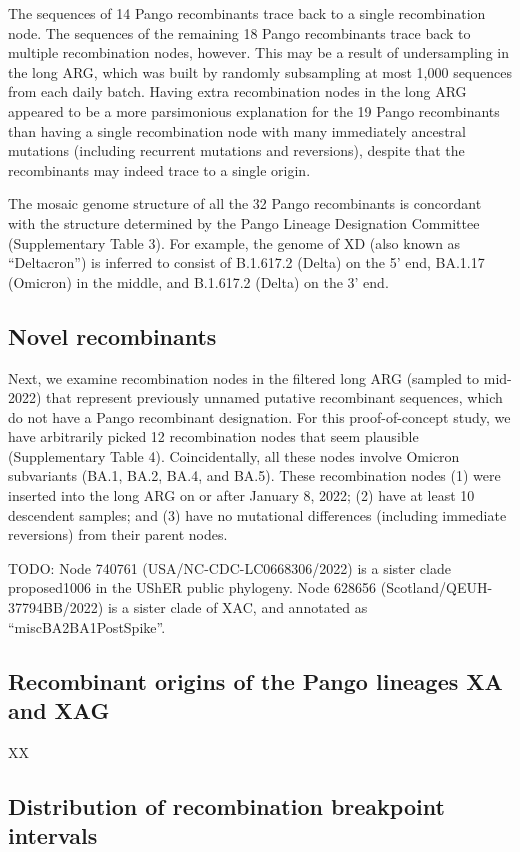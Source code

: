 \documentclass{article}
\begin{document}
The sequences of 14 Pango recombinants trace back to a single recombination
node. The sequences of the remaining 18 Pango recombinants trace back to
multiple recombination nodes, however. This may be a result of undersampling in
the long ARG, which was built by randomly subsampling at most 1,000 sequences
from each daily batch. Having extra recombination nodes in the long ARG
appeared to be a more parsimonious explanation for the 19 Pango recombinants
than having a single recombination node with many immediately ancestral
mutations (including recurrent mutations and reversions), despite that the
recombinants may indeed trace to a single origin.

The mosaic genome structure of all the 32 Pango recombinants is concordant with
the structure determined by the Pango Lineage Designation Committee
(Supplementary Table 3). For example, the genome of XD (also known as
“Deltacron”) is inferred to consist of B.1.617.2 (Delta) on the 5’ end, BA.1.17
(Omicron) in the middle, and B.1.617.2 (Delta) on the 3’ end.

\subsection{Novel recombinants}

Next, we examine recombination nodes in the filtered long ARG (sampled to
mid-2022) that represent previously unnamed putative recombinant sequences,
which do not have a Pango recombinant designation. For this proof-of-concept
study, we have arbitrarily picked 12 recombination nodes that seem plausible
(Supplementary Table 4). Coincidentally, all these nodes involve Omicron
subvariants (BA.1, BA.2, BA.4, and BA.5). These recombination nodes (1) were
inserted into the long ARG on or after January 8, 2022; (2) have at least 10
descendent samples; and (3) have no mutational differences (including immediate
reversions) from their parent nodes.

TODO: Node  740761 (USA/NC-CDC-LC0668306/2022) is a sister clade proposed1006
in the UShER public phylogeny. Node 628656 (Scotland/QEUH-37794BB/2022) is a
sister clade of XAC, and annotated as “miscBA2BA1PostSpike”.

\subsection{Recombinant origins of the Pango lineages XA and XAG}

XX

\subsection{Distribution of recombination breakpoint intervals}
\end{document}

